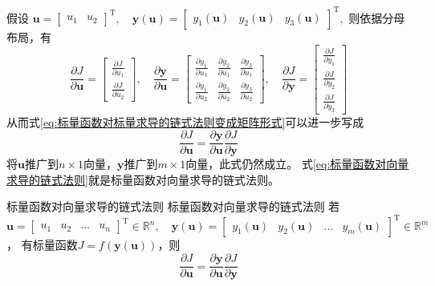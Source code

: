 \documentclass[withoutpreface,bwprint]{NoteBook}
\begin{document}
假设
$\mathbf{u}=
\begin{bmatrix}
    u_1 & u_2
\end{bmatrix}^\mathrm{T},
\quad 
\mathbf{y}(\mathbf{u})=
\begin{bmatrix}
    y_1(\mathbf{u}) & y_2(\mathbf{u}) & y_3(\mathbf{u})
\end{bmatrix}^\mathrm{T},
$
则依据分母布局，有
$$
\frac{\partial J}{\partial \mathbf{u}}
=
\begin{bmatrix}
    \frac{\partial J}{\partial u_1}\\
    \frac{\partial J}{\partial u_2}
\end{bmatrix},
\quad
\frac{\partial \mathbf{y}}{\partial \mathbf{u}}
=
\begin{bmatrix}
    \frac{\partial y_1}{\partial u_1} & \frac{\partial y_2}{\partial u_1} & \frac{\partial y_3}{\partial u_1}  \\
        \frac{\partial y_1}{\partial u_2} &  \frac{\partial y_2}{\partial u_2} &  \frac{\partial y_3}{\partial u_2}
\end{bmatrix},
\quad
\frac{\partial J}{\partial \mathbf{y}}
=
\begin{bmatrix}
    \frac{\partial J}{\partial y_1} \\
    \frac{\partial J}{\partial y_2} \\
    \frac{\partial J}{\partial y_3}
\end{bmatrix}
$$
从而式\cref{eq:标量函数对标量求导的链式法则变成矩阵形式}可以进一步写成
\begin{equation}
    \label{eq:标量函数对向量求导的链式法则}
    \frac{\partial J}{\partial \mathbf{u}}
    =
    \frac{\partial \mathbf{y}}{\partial \mathbf{u}} \frac{\partial J}{\partial \mathbf{y}}
\end{equation}
将$\mathbf{u}$推广到$n \times 1$向量，$\mathbf{y}$推广到$m \times 1$向量，此式仍然成立。
式\cref{eq:标量函数对向量求导的链式法则}就是标量函数对向量求导的链式法则。

\begin{theorem}
    {标量函数对向量求导的链式法则}
    {标量函数对向量求导的链式法则}
    若$\mathbf{u}=
    \begin{bmatrix}
        u_1 & u_2 & \dots & u_n     
    \end{bmatrix}^\mathrm{T} \in \mathbb{R}^n,
    \quad 
    \mathbf{y}(\mathbf{u})=
    \begin{bmatrix}
        y_1(\mathbf{u}) & y_2(\mathbf{u}) & \dots & y_m(\mathbf{u})
    \end{bmatrix}^\mathrm{T} \in \mathbb{R}^m
    $，
    有标量函数$J=f(\mathbf{y}(\mathbf{u}))$，则
    $$
        \frac{\partial J}{\partial \mathbf{u}}
        =
        \frac{\partial \mathbf{y}}{\partial \mathbf{u}} \frac{\partial J}{\partial \mathbf{y}}
    $$
\end{theorem}
\end{document}
